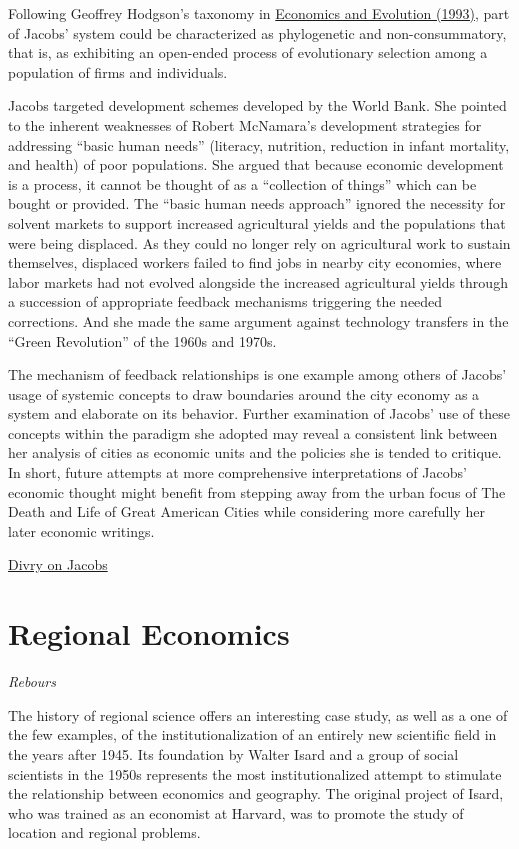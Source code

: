 \documentclass[
]{book}
\begin{document}
Following Geoffrey Hodgson's taxonomy in
\href{https://www.press.umich.edu/14006/economics_and_evolution}{Economics and Evolution (1993)},
part of Jacobs' system could be characterized as phylogenetic and non-consummatory,
that is, as exhibiting an open-ended process of evolutionary selection
among a population of firms and individuals.

Jacobs targeted development schemes developed by the World Bank. She pointed to the inherent weaknesses of Robert McNamara's development strategies for addressing ``basic human needs'' (literacy, nutrition, reduction in infant mortality, and health) of poor populations. She argued that because economic development is a process, it cannot be thought of as a ``collection of things'' which can be bought or provided. The ``basic human needs approach'' ignored the necessity for solvent markets to support increased agricultural yields and the populations that were being displaced. As they could no longer rely on agricultural work to sustain themselves, displaced workers failed to find jobs in nearby city economies, where labor markets had not evolved alongside the increased agricultural yields through a succession of appropriate feedback mechanisms triggering the needed corrections. And she made the same argument against technology transfers in the ``Green Revolution'' of the 1960s and 1970s.

The mechanism of feedback relationships is one example among others of Jacobs' usage of systemic concepts to draw boundaries around the city economy as a system and elaborate on its behavior. Further examination of Jacobs' use of these concepts within the paradigm she adopted may reveal a consistent link between her analysis of cities as economic units and the policies she is tended to critique. In short, future attempts at more comprehensive interpretations of Jacobs' economic thought might benefit from stepping away from the urban focus of The Death and Life of Great American Cities while considering more carefully her later economic writings.

\href{https://hscif.org/economists-in-the-city-divry/}{Divry on Jacobs}

\hypertarget{regional-economics}{%
\section{Regional Economics}\label{regional-economics}}

\emph{Rebours}

The history of regional science offers an interesting case study, as well as a one of the few examples, of the institutionalization of an entirely new scientific field in the years after 1945. Its foundation by Walter Isard and a group of social scientists in the 1950s represents the most institutionalized attempt to stimulate the relationship between economics and geography. The original project of Isard, who was trained as an economist at Harvard, was to promote the study of location and regional problems.
\end{document}
